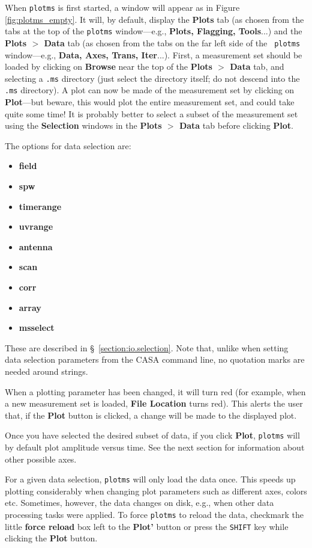 When {\tt plotms} is first started, a window will appear as in Figure
\ref{fig:plotms_empty}. It will, by default, display the {\bf Plots}
tab (as chosen from the tabs at the top of the {\tt plotms}
window---e.g., {\bf Plots, Flagging, Tools}...) and the {\bf Plots $>$
  Data} tab (as chosen from the tabs on the far left side of the {\tt
  plotms} window---e.g., {\bf Data, Axes, Trans, Iter}...). First, a
measurement set should be loaded by clicking on {\bf Browse} near the
top of the {\bf Plots $>$ Data} tab, and selecting a {\tt .ms}
directory (just select the directory itself; do not descend into the
{\tt .ms} directory). A plot can now be made of the measurement set by
clicking on {\bf Plot}---but beware, this would plot the entire
measurement set, and could take quite some time! It is probably better
to select a subset of the measurement set using the {\bf Selection}
windows in the {\bf Plots $>$ Data} tab before clicking {\bf
  Plot}. 

The options for data selection are:
\begin{itemize}
   \item {\bf field}
   \item {\bf spw}
   \item {\bf timerange}
   \item {\bf uvrange}
   \item {\bf antenna}
   \item {\bf scan}
   \item {\bf corr}
   \item {\bf array}
   \item {\bf msselect}
\end{itemize}
These are described in \S~\ref{section:io.selection}. Note that,
unlike when setting data selection parameters from the CASA command
line, no quotation marks are needed around strings.

When a plotting parameter has been changed, it will turn red (for
example, when a new measurement set is loaded, {\bf File Location}
turns red). This alerts the user that, if the {\bf Plot} button is
clicked, a change will be made to the displayed plot.

Once you have selected the desired subset of data, if you click {\bf
  Plot}, {\tt plotms} will by default plot amplitude versus time. See
the next section for information about other possible axes.

For a given data selection, {\tt plotms} will only load the data
once. This speeds up plotting considerably when changing plot
parameters such as different axes, colors etc. Sometimes, however,
the data changes on disk, e.g., when other data processing tasks were
applied. To force {\tt plotms} to reload the data, checkmark the
little {\bf force reload} box left to the {\bf Plot'} button or press
the {\tt SHIFT} key while clicking the {\bf Plot} button.

